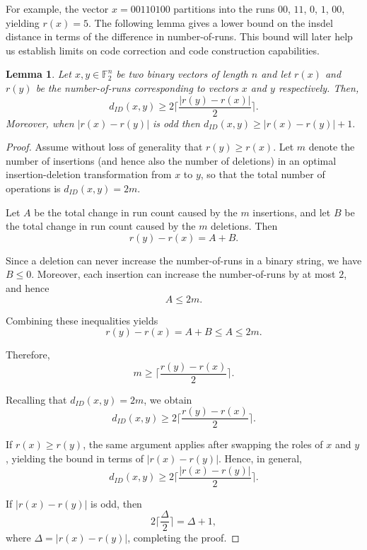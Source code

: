 \documentclass[11 pt]{article}
\numberwithin{equation}{section}
\newtheorem{lemma}[theorem]{Lemma}
\begin{document}
    For example, the vector $x = 00110100$ partitions into the runs $00$, $11$, $0$, $1$, $00$, yielding $r(x) = 5$.
    The following lemma gives a lower bound on the insdel distance in terms of the difference in number-of-runs. This bound will later help us establish limits on code correction and code construction capabilities.
    \begin{lemma}\label{run_insdel_bound}
        Let $x,y \in \mathbb{F}_2^n$ be two binary vectors of length $n$ and let $r(x)$ and $r(y)$ be the number-of-runs corresponding to vectors $x$ and $y$ respectively. Then,
        $$ d_{ID}(x,y) \ge 2 \Big\lceil \frac{|r(y) - r(x)|}{2} \Big\rceil.$$
        Moreover, when $|r(x) - r(y)|$ is odd then $d_{ID}(x,y)\geq |r(x) - r(y)| + 1.$
    \end{lemma}
    \begin{proof}
    Assume without loss of generality that $r(y) \ge r(x)$. Let $m$ denote the number of insertions (and hence also the number of deletions) in an optimal insertion-deletion transformation from $x$ to $y$, so that the total number of operations is $d_{ID}(x,y)=2m$.

    Let $A$ be the total change in run count caused by the $m$ insertions, and let $B$ be the total change in run count caused by the $m$ deletions. Then
    \[
        r(y) - r(x) = A + B.
    \]

    Since a deletion can never increase the number-of-runs in a binary string, we have $B \le 0$. Moreover, each insertion can increase the number-of-runs by at most $2$, and hence
    \[
        A \le 2m.
    \]

    Combining these inequalities yields
    \[
    r(y) - r(x) = A + B \le A \le 2m.
    \]
    
    Therefore,
    \[
    m \ge \Big\lceil \frac{r(y) - r(x)}{2} \Big\rceil.
    \]

    Recalling that $d_{ID}(x,y) = 2m$, we obtain
    \[
    d_{ID}(x,y) \ge 2 \Big\lceil \frac{r(y) - r(x)}{2} \Big\rceil.
    \]

    If $r(x) \ge r(y)$, the same argument applies after swapping the roles of $x$ and $y$, yielding the bound in terms of $\lvert r(x) - r(y) \rvert$. Hence, in general,
    \[
        d_{ID}(x,y) \ge 2 \Big\lceil \frac{\lvert r(x) - r(y) \rvert}{2} \Big\rceil.
    \]

    If $\lvert r(x) - r(y) \rvert$ is odd, then
    \[
        2\Big\lceil \frac{\Delta}{2} \Big\rceil = \Delta + 1,
    \]
    where $\Delta = \lvert r(x) - r(y) \rvert$, completing the proof.
    \end{proof}
\end{document}
